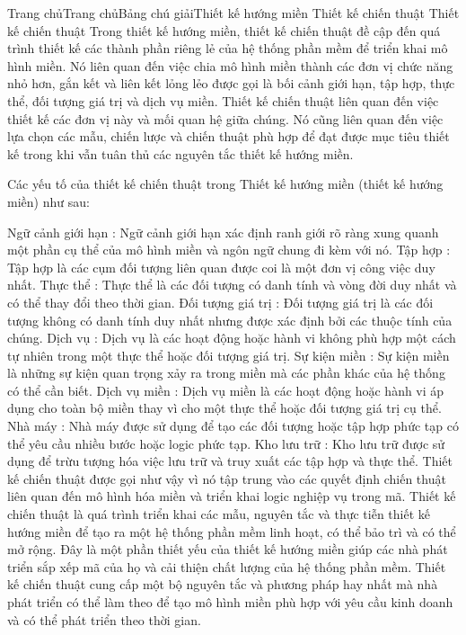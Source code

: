 
Trang chủTrang chủBảng chú giảiThiết kế hướng miền Thiết kế chiến thuật
Thiết kế chiến thuật
Trong thiết kế hướng miền, thiết kế chiến thuật đề cập đến quá trình thiết kế các thành phần riêng lẻ của hệ thống phần mềm để triển khai mô hình miền. Nó liên quan đến việc chia mô hình miền thành các đơn vị chức năng nhỏ hơn, gắn kết và liên kết lỏng lẻo được gọi là bối cảnh giới hạn, tập hợp, thực thể, đối tượng giá trị và dịch vụ miền. Thiết kế chiến thuật liên quan đến việc thiết kế các đơn vị này và mối quan hệ giữa chúng. Nó cũng liên quan đến việc lựa chọn các mẫu, chiến lược và chiến thuật phù hợp để đạt được mục tiêu thiết kế trong khi vẫn tuân thủ các nguyên tắc thiết kế hướng miền.

Các yếu tố của thiết kế chiến thuật trong Thiết kế hướng miền (thiết kế hướng miền) như sau:

Ngữ cảnh giới hạn : Ngữ cảnh giới hạn xác định ranh giới rõ ràng xung quanh một phần cụ thể của mô hình miền và ngôn ngữ chung đi kèm với nó.
Tập hợp : Tập hợp là các cụm đối tượng liên quan được coi là một đơn vị công việc duy nhất.
Thực thể : Thực thể là các đối tượng có danh tính và vòng đời duy nhất và có thể thay đổi theo thời gian.
Đối tượng giá trị : Đối tượng giá trị là các đối tượng không có danh tính duy nhất nhưng được xác định bởi các thuộc tính của chúng.
Dịch vụ : Dịch vụ là các hoạt động hoặc hành vi không phù hợp một cách tự nhiên trong một thực thể hoặc đối tượng giá trị.
Sự kiện miền : Sự kiện miền là những sự kiện quan trọng xảy ra trong miền mà các phần khác của hệ thống có thể cần biết.
Dịch vụ miền : Dịch vụ miền là các hoạt động hoặc hành vi áp dụng cho toàn bộ miền thay vì cho một thực thể hoặc đối tượng giá trị cụ thể.
Nhà máy : Nhà máy được sử dụng để tạo các đối tượng hoặc tập hợp phức tạp có thể yêu cầu nhiều bước hoặc logic phức tạp.
Kho lưu trữ : Kho lưu trữ được sử dụng để trừu tượng hóa việc lưu trữ và truy xuất các tập hợp và thực thể.
Thiết kế chiến thuật được gọi như vậy vì nó tập trung vào các quyết định chiến thuật liên quan đến mô hình hóa miền và triển khai logic nghiệp vụ trong mã. Thiết kế chiến thuật là quá trình triển khai các mẫu, nguyên tắc và thực tiễn thiết kế hướng miền để tạo ra một hệ thống phần mềm linh hoạt, có thể bảo trì và có thể mở rộng. Đây là một phần thiết yếu của thiết kế hướng miền giúp các nhà phát triển sắp xếp mã của họ và cải thiện chất lượng của hệ thống phần mềm. Thiết kế chiến thuật cung cấp một bộ nguyên tắc và phương pháp hay nhất mà nhà phát triển có thể làm theo để tạo mô hình miền phù hợp với yêu cầu kinh doanh và có thể phát triển theo thời gian.

